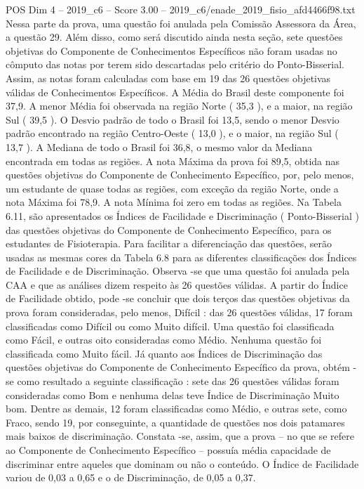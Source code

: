 \begin{textsample}{POS Dim 4 – 2019\_c6 – Score 3.00 – 2019\_c6/enade\_2019\_fisio\_afd4466f98.txt}
Nessa parte da prova, uma questão foi anulada pela Comissão Assessora da Área, a questão 29.
Além disso, como será discutido ainda nesta seção, sete questões objetivas do Componente de Conhecimentos Específicos não foram usadas no cômputo das notas por terem sido descartadas pelo critério do Ponto-Bisserial.
Assim, as notas foram calculadas com base em 19 das 26 questões objetivas válidas de Conhecimentos Específicos.
A Média do Brasil deste componente foi 37,9.
A menor Média foi observada na região Norte ( 35,3 ), e a maior, na região Sul ( 39,5 ).
O Desvio padrão de todo o Brasil foi 13,5, sendo o menor Desvio padrão encontrado na região Centro-Oeste ( 13,0 ), e o maior, na região Sul ( 13,7 ).
A Mediana de todo o Brasil foi 36,8, o mesmo valor da Mediana encontrada em todas as regiões.
A nota Máxima da prova foi 89,5, obtida nas questões objetivas do Componente de Conhecimento Específico, por, pelo menos, um estudante de quase todas as regiões, com exceção da região Norte, onde a nota Máxima foi 78,9.
A nota Mínima foi zero em todas as regiões.
Na Tabela 6.11, são apresentados os Índices de Facilidade e Discriminação ( Ponto-Bisserial ) das questões objetivas do Componente de Conhecimento Específico, para os estudantes de Fisioterapia.
Para facilitar a diferenciação das questões, serão usadas as mesmas cores da Tabela 6.8 para as diferentes classificações dos Índices de Facilidade e de Discriminação.
Observa -se que uma questão foi anulada pela CAA e que as análises dizem respeito às 26 questões válidas.
A partir do Índice de Facilidade obtido, pode -se concluir que dois terços das questões objetivas da prova foram consideradas, pelo menos, Difícil : das 26 questões válidas, 17 foram classificadas como Difícil ou como Muito difícil.
Uma questão foi classificada como Fácil, e outras oito consideradas como Médio.
Nenhuma questão foi classificada como Muito fácil.
Já quanto aos Índices de Discriminação das questões objetivas do Componente de Conhecimento Específico da prova, obtém -se como resultado a seguinte classificação : sete das 26 questões válidas foram consideradas como Bom e nenhuma delas teve Índice de Discriminação Muito bom.
Dentre as demais, 12 foram classificadas como Médio, e outras sete, como Fraco, sendo 19, por conseguinte, a quantidade de questões nos dois patamares mais baixos de discriminação.
Constata -se, assim, que a prova – no que se refere ao Componente de Conhecimento Específico – possuía média capacidade de discriminar entre aqueles que dominam ou não o conteúdo.
O Índice de Facilidade variou de 0,03 a 0,65 e o de Discriminação, de 0,05 a 0,37.

\end{textsample}

